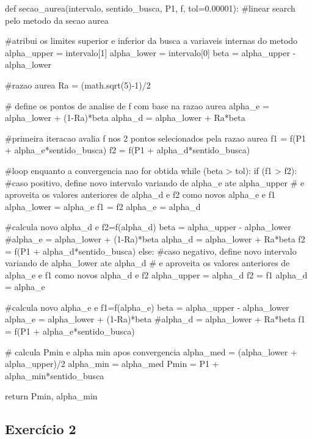 \documentclass[10pt, a4paper]{article}
\begin{document}
\begin{python}

  def secao_aurea(intervalo, sentido_busca, P1, f, tol=0.00001):
    #linear search pelo metodo da secao aurea
      
    #atribui os limites superior e inferior da busca a variaveis internas do metodo
    alpha_upper = intervalo[1]
    alpha_lower = intervalo[0]
    beta = alpha_upper - alpha_lower
      
    #razao aurea
    Ra = (math.sqrt(5)-1)/2
      
    # define os pontos de analise de f com base na razao aurea
    alpha_e = alpha_lower + (1-Ra)*beta
    alpha_d = alpha_lower + Ra*beta 
      
    #primeira iteracao avalia f nos 2 pontos selecionados pela razao aurea
    f1 = f(P1 + alpha_e*sentido_busca)
    f2 = f(P1 + alpha_d*sentido_busca)
      
    #loop enquanto a convergencia nao for obtida
    while (beta > tol):
        if (f1 > f2):
            #caso positivo, define novo intervalo variando de alpha_e ate alpha_upper
            # e aproveita os valores anteriores de alpha_d e f2 como novos alpha_e e f1
            alpha_lower = alpha_e
            f1 = f2
            alpha_e = alpha_d            
              
            #calcula novo alpha_d e f2=f(alpha_d)
            beta = alpha_upper - alpha_lower
            #alpha_e = alpha_lower + (1-Ra)*beta
            alpha_d = alpha_lower + Ra*beta 
            f2 = f(P1 + alpha_d*sentido_busca)
        else:
            #caso negativo, define novo intervalo variando de alpha_lower ate alpha_d
            # e aproveita os valores anteriores de alpha_e e f1 como novos alpha_d e f2
            alpha_upper = alpha_d
            f2 = f1
            alpha_d = alpha_e
              
            #calcula novo alpha_e e f1=f(alpha_e)
            beta = alpha_upper - alpha_lower
            alpha_e = alpha_lower + (1-Ra)*beta
            #alpha_d = alpha_lower + Ra*beta 
            f1 = f(P1 + alpha_e*sentido_busca)
              
    # calcula Pmin e alpha min apos convergencia
    alpha_med = (alpha_lower + alpha_upper)/2
    alpha_min = alpha_med
    Pmin = P1 + alpha_min*sentido_busca
      
    return Pmin, alpha_min
\end{python}

\subsection{Exercício 2}
\end{document}

